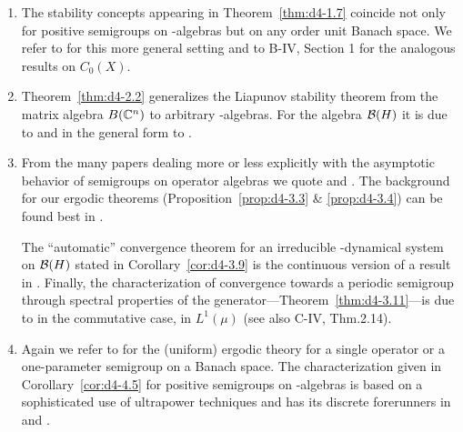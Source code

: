 \begin{enumerate}[label=\emph{Section \arabic*:}, wide]
\item
The stability concepts appearing in Theorem~\ref{thm:d4-1.7} coincide not only for positive semigroups on \CA-algebras but on any order unit Banach space.
We refer to \citet{battyrobinson:1984} for this more general setting and to B-IV, Section 1 for the analogous results on $ C_{0}(X) $.

\item
Theorem~\ref{thm:d4-2.2} generalizes the Liapunov stability theorem from the matrix algebra $ B(\mathbb{C}^{n}) $  to arbitrary \WA-algebras.
For the algebra $ \mathcal{B}(H) $  it is due to \citet{milstein:1975} and in the general form to \citet{grohneubrander:1981}.

\item
From the many papers dealing more or less explicitly with the asymptotic behavior of semigroups on operator algebras we quote \citet{frigerioverri:1982} and \citet{watanabe:1982}.
The background for our ergodic theorems (Proposition~\ref{prop:d4-3.3} \& \ref{prop:d4-3.4}) can be found best in \citet{krengel:1985}.

The \enquote{automatic} convergence theorem for an irreducible \WA-dynamical system on $ \mathcal{B}(H) $  stated in Corollary~\ref{cor:d4-3.9} is the continuous version of a result in \citet{groh:1984c}.
Finally, the characterization of convergence towards a periodic semigroup through spectral properties of the generator---Theorem~\ref{thm:d4-3.11}---is due to \citet{nagel:1984} in the commutative case, \ie in $ L^{1}(\mu) $ (see also C-IV, Thm.2.14).

\item
Again we refer to \citet{krengel:1985} for the (uniform) ergodic theory for a single operator or a one-parameter semigroup on a Banach space.
The characterization given in Corollary~\ref{cor:d4-4.5} for positive semigroups on \WA-algebras is based on a sophisticated use of ultrapower techniques and has its discrete forerunners in \citet{lotz:1981} and 
\citet{groh:1984b}.
\end{enumerate}

